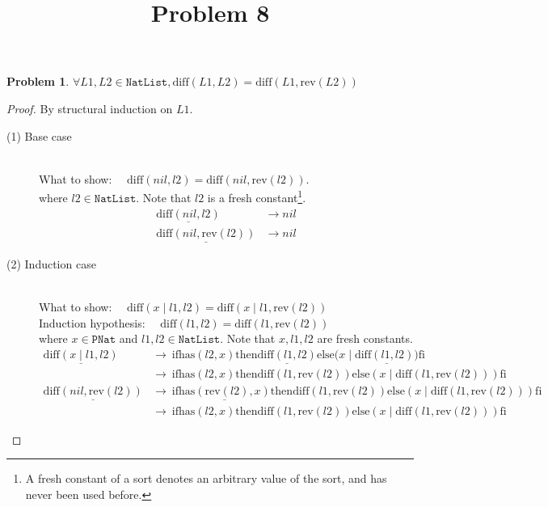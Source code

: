 \documentclass[12pt, a4paper]{article}
\title{Problem 8}
\date{\vspace{-5ex}}
\newtheorem{problem}{Problem}
\newcommand{\rel}[1]{\mathrel{#1}}
\newcommand{\rmx}[1]{\mathrm{#1}}
\newcommand{\larrow}{\longrightarrow}
\newcommand{\under}{\underline}
\begin{document}
\maketitle

\begin{problem}
$\forall L1, L2 \in \mathtt{NatList}, \rmx{diff}(L1, L2) = \rmx{diff}(L1, \rmx{rev}(L2))$
\end{problem}
\begin{proof}
By structural induction on $L1$.

\begin{description}
\item[(1) Base case]~\\
\noindent
What to show: $\quad \rmx{diff}(nil, l2) = \rmx{diff}(nil, \rmx{rev}(l2))$. \\
where $l2 \in \mathtt{NatList}$.
Note that $l2$ is a fresh constant\footnote{A fresh constant of a sort denotes an arbitrary value of the sort, and has never been used before.}.
\begin{align*}
\under{\rmx{diff}(nil, l2)}
	&\larrow nil \tag{by diff1} \\
\under{\rmx{diff}(nil, \rmx{rev}(l2))}
	&\larrow nil \tag{by diff1}
\end{align*}
\item[(2) Induction case]~\\
What to show: $\quad \rmx{diff}(x \rel{|} l1, l2) = \rmx{diff}(x \rel{|} l1, \rmx{rev}(l2))$ \\
Induction hypothesis: $\quad \rmx{diff}(l1, l2) = \rmx{diff}(l1, \rmx{rev}(l2))$  \\
where $x \in \mathtt{PNat}$ and $l1, l2 \in \mathtt{NatList}$.
Note that $x, l1, l2$ are fresh constants.
\begin{align*}
\under{\rmx{diff}(x \rel{|} l1, l2)}
	&\larrow\ \rel{\rmx{if}} \rmx{has}(l2, x) \rel{\rmx{then}} \under{\rmx{diff}(l1, l2)} \rel{\rmx{else}} (x \rel{|} \under{\rmx{diff}(l1, l2))} \rel{\rmx{fi}} \tag{by diff2} \\
	&\larrow\ \rel{\rmx{if}} \rmx{has}(l2, x) \rel{\rmx{then}} \rmx{diff}(l1, \rmx{rev}(l2)) \rel{\rmx{else}} (x \rel{|} \rmx{diff}(l1, \rmx{rev}(l2))) \rel{\rmx{fi}} \tag{by IH} \\
\under{\rmx{diff}(nil, \rmx{rev}(l2))}
	&\larrow\ \rel{\rmx{if}} \under{\rmx{has}(\rmx{rev}(l2), x)} \rel{\rmx{then}} \rmx{diff}(l1, \rmx{rev}(l2)) \rel{\rmx{else}} (x \rel{|} \rmx{diff}(l1, \rmx{rev}(l2))) \rel{\rmx{fi}} \tag{by diff2} \\
	&\larrow\ \rel{\rmx{if}} \rmx{has}(l2, x) \rel{\rmx{then}} \rmx{diff}(l1, \rmx{rev}(l2)) \rel{\rmx{else}} (x \rel{|} \rmx{diff}(l1, \rmx{rev}(l2))) \rel{\rmx{fi}} \tag{by Problem 6}
\end{align*}

\end{description}

\end{proof}
\end{document}
